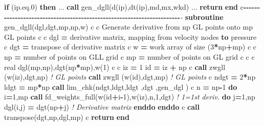 \documentclass[
]{scrartcl}
\newenvironment{Shaded}{}{}
\newcommand{\CommentTok}[1]{\textcolor[rgb]{0.38,0.63,0.69}{\textit{#1}}}
\newcommand{\DataTypeTok}[1]{\textcolor[rgb]{0.56,0.13,0.00}{#1}}
\newcommand{\DecValTok}[1]{\textcolor[rgb]{0.25,0.63,0.44}{#1}}
\newcommand{\FunctionTok}[1]{\textcolor[rgb]{0.02,0.16,0.49}{#1}}
\newcommand{\KeywordTok}[1]{\textcolor[rgb]{0.00,0.44,0.13}{\textbf{#1}}}
\newcommand{\NormalTok}[1]{#1}
\newcommand{\OperatorTok}[1]{\textcolor[rgb]{0.40,0.40,0.40}{#1}}
\newcommand{\StringTok}[1]{\textcolor[rgb]{0.25,0.44,0.63}{#1}}
\begin{document}
\begin{Shaded}
\begin{Highlighting}[]
       \KeywordTok{if}\NormalTok{ (ip}\OperatorTok{.eq.}\DecValTok{0}\NormalTok{) }\KeywordTok{then}
\NormalTok{       ...}
          \KeywordTok{call}\NormalTok{ gen\_dgll(d(ip),dt(ip),md,mx,wkd)}
\NormalTok{       ...}
       \KeywordTok{return}
       \KeywordTok{end}
\NormalTok{ c}\KeywordTok{{-}{-}{-}{-}{-}{-}{-}{-}{-}{-}{-}{-}{-}{-}{-}{-}{-}{-}{-}{-}{-}{-}{-}{-}{-}{-}{-}{-}{-}{-}{-}{-}{-}{-}{-}{-}{-}{-}{-}{-}{-}{-}{-}{-}{-}{-}{-}{-}{-}{-}{-}{-}{-}{-}{-}{-}{-}{-}{-}{-}{-}{-}{-}{-}{-}{-}{-}{-}{-}{-}}\CommentTok{{-}}
       \KeywordTok{subroutine}\NormalTok{ gen\_dgll(dgl,dgt,mp,np,w)}
\NormalTok{ c}
\NormalTok{ c     Generate derivative from np GL points onto mp GL points}
\NormalTok{ c}
\NormalTok{ c        dgl  }\KeywordTok{=}\NormalTok{ derivative matrix, mapping from velocity nodes }\KeywordTok{to}\NormalTok{ pressure}
\NormalTok{ c        dgt  }\KeywordTok{=} \FunctionTok{transpose}\NormalTok{ of derivative matrix}
\NormalTok{ c        w    }\KeywordTok{=}\NormalTok{ work array of }\FunctionTok{size}\NormalTok{ (}\DecValTok{3}\KeywordTok{*}\NormalTok{np}\KeywordTok{+}\NormalTok{mp)}
\NormalTok{ c}
\NormalTok{ c        np   }\KeywordTok{=}\NormalTok{ number of points on GLL grid}
\NormalTok{ c        mp   }\KeywordTok{=}\NormalTok{ number of points on GL  grid}
\NormalTok{ c}
\NormalTok{ c}
\NormalTok{ c}
       \DataTypeTok{real}\NormalTok{ dgl(mp,np),dgt(np}\KeywordTok{*}\NormalTok{mp),w(}\DecValTok{1}\NormalTok{)}
\NormalTok{ c}
\NormalTok{ c}
\NormalTok{       iz }\KeywordTok{=} \DecValTok{1}
\NormalTok{       id }\KeywordTok{=}\NormalTok{ iz }\KeywordTok{+}\NormalTok{ np}
\NormalTok{ c}
       \KeywordTok{call}\NormalTok{ zwgll (w(iz),dgt,np)  }\CommentTok{! GL points}
       \KeywordTok{call}\NormalTok{ zwgll (w(id),dgt,mp)  }\CommentTok{! GL points}
\NormalTok{ c}
\NormalTok{       ndgt }\KeywordTok{=} \DecValTok{2}\KeywordTok{*}\NormalTok{np}
\NormalTok{       ldgt }\KeywordTok{=}\NormalTok{ mp}\KeywordTok{*}\NormalTok{np}
       \KeywordTok{call}\NormalTok{ lim\_chk(ndgt,ldgt,}\StringTok{\textquotesingle{}ldgt \textquotesingle{}}\NormalTok{,}\StringTok{\textquotesingle{}dgt  \textquotesingle{}}\NormalTok{,}\StringTok{\textquotesingle{}gen\_dgl   \textquotesingle{}}\NormalTok{)}
\NormalTok{ c}
\NormalTok{       n  }\KeywordTok{=}\NormalTok{ np}\KeywordTok{{-}}\DecValTok{1}
       \KeywordTok{do}\NormalTok{ i}\KeywordTok{=}\DecValTok{1}\NormalTok{,mp}
          \KeywordTok{call}\NormalTok{ fd\_weights\_full(w(id}\KeywordTok{+}\NormalTok{i}\KeywordTok{{-}}\DecValTok{1}\NormalTok{),w(iz),n,}\DecValTok{1}\NormalTok{,dgt) }\CommentTok{! 1=1st deriv.}
          \KeywordTok{do}\NormalTok{ j}\KeywordTok{=}\DecValTok{1}\NormalTok{,np}
\NormalTok{             dgl(i,j) }\KeywordTok{=}\NormalTok{ dgt(np}\KeywordTok{+}\NormalTok{j)                       }\CommentTok{! Derivative matrix}
          \KeywordTok{enddo}
       \KeywordTok{enddo}
\NormalTok{ c}
       \KeywordTok{call} \FunctionTok{transpose}\NormalTok{(dgt,np,dgl,mp)}
\NormalTok{ c}
       \KeywordTok{return}
       \KeywordTok{end}
\end{Highlighting}
\end{Shaded}
\end{document}
